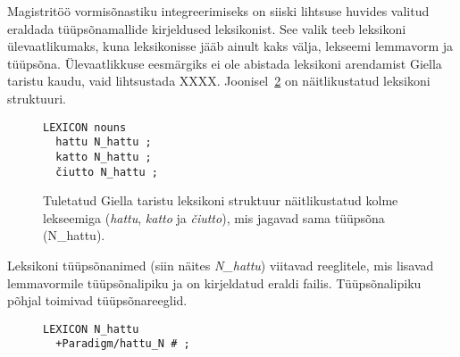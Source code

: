 \documentclass[12pt,a4paper]{article}
\begin{document}
Magistritöö vormisõnastiku integreerimiseks on siiski lihtsuse huvides valitud eraldada tüüpsõna\-mallide kirjeldused leksikonist. See valik teeb leksikoni ülevaatlikumaks, kuna leksikonisse jääb ainult kaks välja, lekseemi lemma\-vorm ja tüüpsõna. Ülevaatlikkuse eesmärgiks ei ole abistada leksikoni arendamist Giella taristu kaudu, vaid lihtsustada XXXX. Joonisel~\ref{code:giella-lexicon} on näitlikustatud leksikoni struktuuri.

\begin{figure}[H]
  \center
\begin{verbatim}
LEXICON nouns
  hattu N_hattu ;
  katto N_hattu ;
  čiutto N_hattu ;
\end{verbatim}
\caption{Tuletatud Giella taristu leksikoni struktuur näitlikustatud kolme lekseemiga (\textit{hattu}, \textit{katto} ja \textit{čiutto}), mis jagavad sama tüüp\-sõna (N\_hattu).
  \label{code:giella-lexicon}}
\end{figure}

Leksikoni tüüpsõnanimed (siin näites \textit{N\_hattu}) viitavad reeglitele, mis lisavad lemma\-vormile tüüpsõna\-lipiku ja on kirjeldatud eraldi failis. Tüüpsõna\-lipiku põhjal toimivad tüüpsõna\-reeglid.

\begin{figure}[H]
  \center
\begin{verbatim}
LEXICON N_hattu
  +Paradigm/hattu_N # ;
\end{verbatim}
\caption{
  \label{code:giella-lexicon}}
\end{figure}



% 
% 
% 
%
\end{document}
